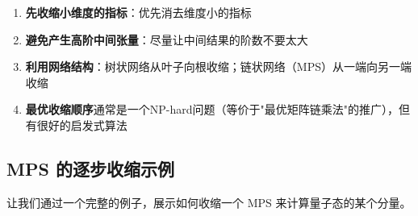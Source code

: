 \documentclass[12pt,a4paper]{ctexart}
\begin{document}
\begin{keybox}[收缩的黄金法则]
\begin{enumerate}
    \item \textbf{先收缩小维度的指标}：优先消去维度小的指标
    \item \textbf{避免产生高阶中间张量}：尽量让中间结果的阶数不要太大
    \item \textbf{利用网络结构}：树状网络从叶子向根收缩；链状网络（MPS）从一端向另一端收缩
    \item \textbf{最优收缩顺序}通常是一个NP-hard问题（等价于"最优矩阵链乘法"的推广），但有很好的启发式算法
\end{enumerate}
\end{keybox}

\subsection{MPS 的逐步收缩示例}

让我们通过一个完整的例子，展示如何收缩一个 MPS 来计算量子态的某个分量。
\end{document}
